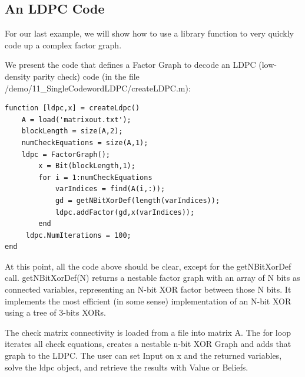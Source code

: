 \ifmatlab

\subsection{An LDPC Code}
For our last example, we will show how to use a library function to very quickly code up a complex factor graph.

We present the code that defines a Factor Graph to decode an LDPC (low-density parity check) code (in the file /demo/11\_SingleCodewordLDPC/createLDPC.m):

\begin{lstlisting}
function [ldpc,x] = createLdpc()
    A = load('matrixout.txt');
    blockLength = size(A,2);
    numCheckEquations = size(A,1);
    ldpc = FactorGraph();   
        x = Bit(blockLength,1);     
        for i = 1:numCheckEquations
            varIndices = find(A(i,:));
            gd = getNBitXorDef(length(varIndices));
            ldpc.addFactor(gd,x(varIndices));
        end       
     ldpc.NumIterations = 100;
end
\end{lstlisting}


At this point, all the code above should be clear, except for the getNBitXorDef call. getNBitXorDef(N) returns a nestable factor graph with an array of N bits as connected variables, representing an N-bit XOR factor between those N bits. It implements the most efficient (in some sense) implementation of an N-bit XOR using a tree of 3-bits XORs.

The check matrix connectivity is loaded from a file into matrix A. The for loop iterates all check equations, creates a nestable n-bit XOR Graph and adds that graph to the LDPC.  The user can set Input on x and the returned variables, solve the ldpc object, and retrieve the results with Value or Beliefs.

\fi
